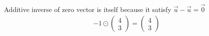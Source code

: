 \documentclass[11pt]{article}
\begin{document}
\paragraph{}Additive inverse of zero vector is itself because it satisfy $\vec{u}-\vec{u}=\vec{0}$
\begin{eqnarray*}
-1
\odot
\begin{pmatrix}
4\\
3
\end{pmatrix}
=
\begin{pmatrix}
4\\
3
\end{pmatrix}
\end{eqnarray*}
\end{document}
